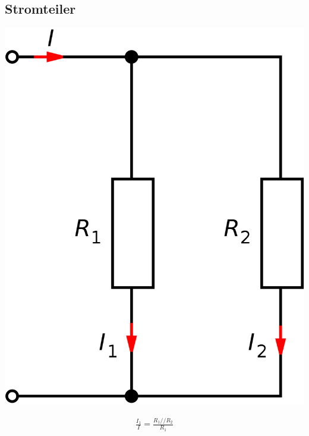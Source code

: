 \subsection{Stromteiler}
\begin{minipage}{0.20\textwidth}
	
	\includegraphics[width=0.8\linewidth,keepaspectratio=true]{./Images/stromteiler}
\end{minipage}%
\begin{minipage}{0.30\textwidth}
	\begin{align*}
		\frac{I_1}{I} = \frac{R_1//R_2}{R_1}
	\end{align*}
\end{minipage}

